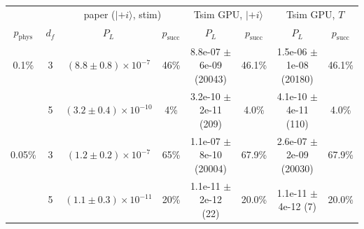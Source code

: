 \begin{tabular}{cc cc | cc | cc}
\toprule
 & & \multicolumn{2}{c|}{paper ($|{+i}\rangle$, stim)} & \multicolumn{2}{c|}{Tsim GPU, $|{+i}\rangle$} & \multicolumn{2}{c}{Tsim GPU, $T$}\\
$p_\text{phys}$ & $d_f$ & $P_L$ & $p_\text{succ}$ & $P_L$ & $p_\text{succ}$ & $P_L$ & $p_\text{succ}$\\
\midrule
0.1\% & 3 & $(8.8\pm 0.8)\times 10^{-7}$ & 46\% & 8.8e-07 $\pm$ 6e-09 (20043) & 46.1\% & 1.5e-06 $\pm$ 1e-08 (20180) & 46.1\% \\
 & 5 & $(3.2\pm 0.4)\times 10^{-10}$ & 4\% & 3.2e-10 $\pm$ 2e-11 (209) & 4.0\% & 4.1e-10 $\pm$ 4e-11 (110) & 4.0\% \\
0.05\% & 3 & $(1.2\pm 0.2)\times 10^{-7}$ & 65\% & 1.1e-07 $\pm$ 8e-10 (20004) & 67.9\% & 2.6e-07 $\pm$ 2e-09 (20030) & 67.9\% \\
 & 5 & $(1.1\pm 0.3)\times 10^{-11}$ & 20\% & 1.1e-11 $\pm$ 2e-12 (22) & 20.0\% & 1.1e-11 $\pm$ 4e-12 (7) & 20.0\% \\
\bottomrule
\end{tabular}

